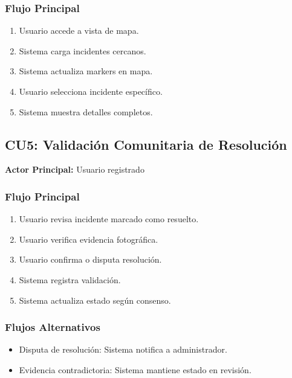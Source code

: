 \subsubsection*{Flujo Principal}
\begin{enumerate}
    \item Usuario accede a vista de mapa.
    \item Sistema carga incidentes cercanos.
    \item Sistema actualiza markers en mapa.
    \item Usuario selecciona incidente específico.
    \item Sistema muestra detalles completos.
\end{enumerate}

\subsection{CU5: Validación Comunitaria de Resolución}
\textbf{Actor Principal:} Usuario registrado

\subsubsection*{Flujo Principal}
        \begin{enumerate}
            \item Usuario revisa incidente marcado como resuelto.
            \item Usuario verifica evidencia fotográfica.
            \item Usuario confirma o disputa resolución.
            \item Sistema registra validación.
            \item Sistema actualiza estado según consenso.
        \end{enumerate}
        
\subsubsection*{Flujos Alternativos}
        \begin{itemize}
            \item Disputa de resolución: Sistema notifica a administrador.
            \item Evidencia contradictoria: Sistema mantiene estado en revisión.
        \end{itemize}
